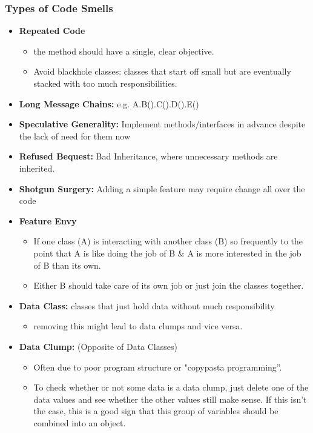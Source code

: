 \documentclass[a4paper]{article}
\begin{document}
\subsubsection{Types of Code Smells}
\begin{itemize}
	\item \textbf{Repeated Code}
	\begin{itemize}[label=$\circ$]
		\item the method should have a single, clear objective.
		\item Avoid blackhole classes: classes that start off small but are eventually stacked with too much responsibilities.
	\end{itemize}
	\item \textbf{Long Message Chains:} e.g. A.B().C().D().E()
	\item \textbf{Speculative Generality:} Implement methods/interfaces in advance despite the lack of need for them now
	\item \textbf{Refused Bequest:} Bad Inheritance, where unnecessary methods are inherited.
	\item \textbf{Shotgun Surgery:} Adding a simple feature may require change all over the code
	\item \textbf{Feature Envy}
	\begin{itemize}[label=$\circ$]
		\item If one class (A) is interacting with another class (B) so frequently to the point that A is like doing the job of B \& A is more interested in the job of B than its own.
		\item Either B should take care of its own job or just join the classes together.
	\end{itemize}
	\item \textbf{Data Class:} classes that just hold data without much responsibility
	\begin{itemize}[label=$\circ$]
		\item removing this might lead to data clumps and vice versa.
	\end{itemize}
	\item \textbf{Data Clump:} (Opposite of Data Classes)
	\begin{itemize}[label=$\circ$]
		\item Often due to poor program structure or "copypasta programming”.
		\item To check whether or not some data is a data clump, just delete one of the data values and see whether the other values still make sense. If this isn’t the case, this is a good sign that this group of variables should be combined into an object.

\end{itemize}
\end{itemize}
\end{document}
